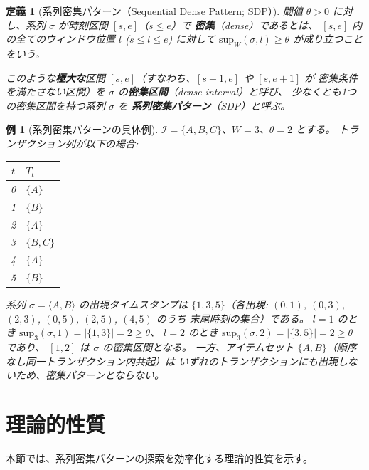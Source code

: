 \documentclass[11pt,a4paper]{article}
\newtheorem{definition}{定義}[section]
\newtheorem{example}{例}[section]
\begin{document}
\begin{definition}[系列密集パターン（Sequential Dense Pattern; SDP）]
\label{def:sdp}
閾値 $\theta > 0$ に対し、系列 $\sigma$ が時刻区間 $[s, e]$（$s \le e$）で
\textbf{密集}（dense）であるとは、
$[s, e]$ 内の全てのウィンドウ位置 $l$ ($s \le l \le e$) に対して
$\mathrm{sup}_W(\sigma, l) \ge \theta$
が成り立つことをいう。

このような\textbf{極大な}区間 $[s, e]$（すなわち、$[s-1, e]$ や $[s, e+1]$ が
密集条件を満たさない区間）を
$\sigma$ の\textbf{密集区間}（dense interval）と呼び、
少なくとも1つの密集区間を持つ系列 $\sigma$ を
\textbf{系列密集パターン}（SDP）と呼ぶ。
\end{definition}

\begin{example}[系列密集パターンの具体例]
\label{ex:sdp}
$\mathcal{I} = \{A, B, C\}$、$W = 3$、$\theta = 2$ とする。
トランザクション列が以下の場合:
\begin{center}
\begin{tabular}{cl}
\toprule
$t$ & $T_t$ \\
\midrule
0 & $\{A\}$ \\
1 & $\{B\}$ \\
2 & $\{A\}$ \\
3 & $\{B, C\}$ \\
4 & $\{A\}$ \\
5 & $\{B\}$ \\
\bottomrule
\end{tabular}
\end{center}
系列 $\sigma = \langle A, B \rangle$ の出現タイムスタンプは
$\{1, 3, 5\}$（各出現: $(0,1)$, $(0,3)$, $(2,3)$, $(0,5)$, $(2,5)$, $(4,5)$ のうち
末尾時刻の集合）である。
$l=1$ のとき $\mathrm{sup}_3(\sigma, 1) = |\{1, 3\}| = 2 \ge \theta$、
$l=2$ のとき $\mathrm{sup}_3(\sigma, 2) = |\{3, 5\}| = 2 \ge \theta$ であり、
$[1, 2]$ は $\sigma$ の密集区間となる。
一方、アイテムセット $\{A, B\}$（順序なし同一トランザクション内共起）は
いずれのトランザクションにも出現しないため、密集パターンとならない。
\end{example}

\section{理論的性質}
\label{sec:theory}

本節では、系列密集パターンの探索を効率化する理論的性質を示す。
\end{document}

